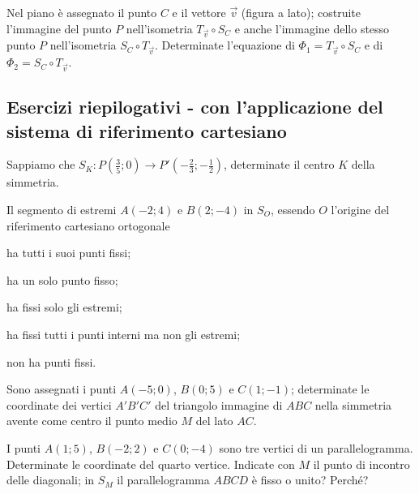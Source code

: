 \begin{esercizio}
  \label{ese:8.63} %
  Nel piano è assegnato il punto $C$ e il vettore $\vec{v}$ (figura a 
  lato); costruite l'immagine del punto $P$ nell'isometria $T_{\vec{v}} 
  \circ S_{C}$ e anche l'immagine dello stesso punto $P$ nell'isometria 
  $S_{C} \circ T_{\vec{v}}$. Determinate l'equazione di $\Phi_1 = 
  T_{\vec{v}} \circ S_{C}$ e di $\Phi_2 = S_{C} \circ T_{\vec{v}}$.
\end{esercizio}

\subsection{Esercizi riepilogativi - con l'applicazione del sistema di 
riferimento cartesiano}

\begin{esercizio}
  \label{ese:8.7}
  Sappiamo che $S_K:P\left(\frac{3}{5};0\right) \rightarrow 
  P'\left(-\frac{2}{3};-\frac{1}{2}\right)$, determinate il centro $K$ 
  della simmetria. 
\end{esercizio}

\begin{esercizio}
  \label{ese:8.8}
  Il segmento di estremi $A(-2;4)$ e $B(2;-4)$ in $S_O$, essendo $O$ 
  l'origine del riferimento cartesiano ortogonale
  \begin{enumeratea}
    \item ha tutti i suoi punti fissi;
    \item ha un solo punto fisso;
    \item ha fissi solo gli estremi;
    \item ha fissi tutti i punti interni ma non gli estremi;
    \item non ha punti fissi.
  \end{enumeratea}
\end{esercizio}

\begin{esercizio}
  \label{ese:8.9}
  Sono assegnati i punti $A(-5;0)$, $B(0;5)$ e $C(1;-1)$; determinate 
  le coordinate dei vertici $A'B'C'$ del triangolo immagine di $ABC$ 
  nella simmetria avente come centro il punto medio $M$ del lato $AC$.
\end{esercizio}

\begin{esercizio}
  \label{ese:8.10}
  I punti $A(1;5)$, $B(-2;2)$ e $C(0;-4)$ sono tre vertici di un 
  parallelogramma. Determinate le coordinate del quarto vertice. 
  Indicate con $M$ il punto di incontro delle diagonali; in $S_M$ il 
  parallelogramma $ABCD$ è fisso o unito? Perché?
\end{esercizio}

